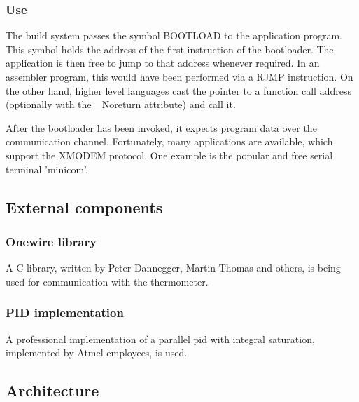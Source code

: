 \subsubsection{Use}
The build system passes the symbol BOOTLOAD to the application program.
This symbol holds the address of the first instruction of the bootloader.
The application is then free to jump to that address whenever required.
In an assembler program, this would have been performed via a RJMP instruction.
On the other hand, higher level languages cast the pointer to a function call address (optionally with the \_Noreturn attribute) and call it.
\par
After the bootloader has been invoked, it expects program data over the communication channel.
Fortunately, many applications are available, which support the XMODEM protocol.
One example is the popular and free serial terminal 'minicom'.

\subsection{External components}
\subsubsection{Onewire library}
A C library, written by Peter Dannegger, Martin Thomas and others, is being used for communication with the thermometer.

\subsubsection{PID implementation}
A professional implementation of a parallel pid with integral saturation, implemented by Atmel employees, is used.

\subsection{Architecture}
